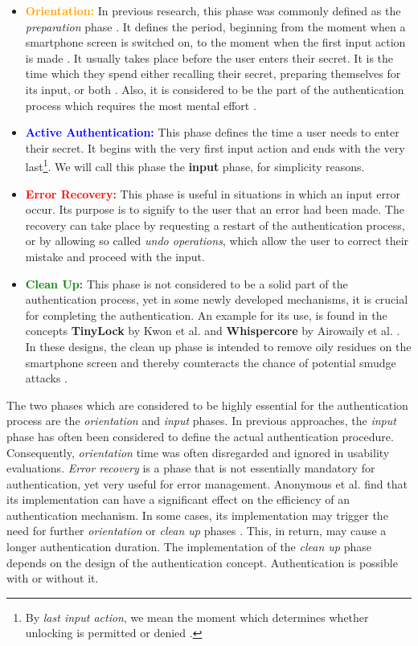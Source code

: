 \begin{itemize}
    \item \textbf{\textcolor{orange}{Orientation:}} In previous research, this phase was commonly defined as the \textit{preparation} phase \cite{anonymous}. It defines the period, beginning from the moment when a smartphone screen is switched on, to the moment when the first input action is made \cite{anonymous}. It usually takes place before the user enters their secret. It is the time which they spend either recalling their secret, preparing themselves for its input, or both \cite{anonymous}. Also, it is considered to be the part of the authentication process which requires the most mental effort \cite{anonymous}.  
    \item \textbf{\textcolor{blue}{Active Authentication:}} This phase defines the time a user needs to enter their secret. It begins with the very first input action and ends with the very last\footnote{By \textit{last input action}, we mean the moment which determines whether unlocking is permitted or denied \cite{anonymous}.}. We will call this phase the \textbf{input} phase, for simplicity reasons.
    \item \textbf{\textcolor{red}{Error Recovery:}} This phase is useful in situations in which an input error occur. Its purpose is to signify to the user that an error had been made. The recovery can take place by requesting a restart of the authentication process, or by allowing so called \textit{undo operations}, which allow the user to correct their mistake and proceed with the input. 
    \item \textbf{\textcolor{green}{Clean Up:}} This phase is not considered to be a solid part of the authentication process, yet in some newly developed mechanisms, it is crucial for completing the authentication. An example for its use, is found in the concepts \textbf{TinyLock} by Kwon et al. \cite{kwon} and \textbf{Whispercore} by Airowaily et al. \cite{Airowaily}. In these designs, the clean up phase is intended to remove oily residues on the smartphone screen and thereby counteracts the chance of potential smudge attacks \cite{anonymous}. 
\end{itemize}

The two phases which are considered to be highly essential for the authentication process are the \textit{orientation} and \textit{input} phases. In previous approaches, the \textit{input} phase has often been considered to define the actual authentication procedure. Consequently, \textit{orientation} time was often disregarded and ignored in usability evaluations. \textit{Error recovery} is a phase that is not essentially mandatory for authentication, yet very useful for error management. Anonymous et al. \cite{anonymous} find that its implementation can have a significant effect on the efficiency of an authentication mechanism. In some cases, its implementation may trigger the need for further \textit{orientation} or \textit{clean up} phases \cite{anonymous}. This, in return, may cause a longer authentication duration. The implementation of the \textit{clean up} phase depends on the design of the authentication concept. Authentication is possible with or without it. \\


